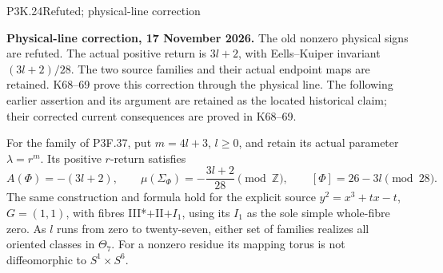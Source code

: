 \begin{statement}{P3K.24}{Refuted; physical-line correction}\par\noindent\textbf{Physical-line correction, 17 November 2026.} The old nonzero physical signs are refuted. The actual positive return is \(3l+2\), with Eells--Kuiper invariant \((3l+2)/28\). The two source families and their actual endpoint maps are retained. K68--69 prove this correction through the physical line. The following earlier assertion and its argument are retained as the located historical claim; their corrected current consequences are proved in K68--69.\medskip\par 
For the family of P3F.37, put $m=4l+3$, $l\ge0$, and retain
its actual parameter $\lambda=r^m$. Its positive $r$-return
satisfies
\[
 A(\Phi)=-(3l+2),\qquad
 \mu(\Sigma_\Phi)=-\frac{3l+2}{28}\pmod{\mathbb Z},
 \qquad [\Phi]=26-3l\pmod{28}.                         \tag{K24.1}
\]
The same construction and formula hold for the explicit source
$y^2=x^3+tx-t$, $G=(1,1)$, with fibres III*$+$II$+I_1$,
using its $I_1$ as the sole simple whole-fibre zero. As $l$ runs
from zero to twenty-seven, either set of families realizes all
oriented classes in $\Theta_7$. For a nonzero residue its mapping
torus is not diffeomorphic to $S^1\times S^6$.
\end{statement}
